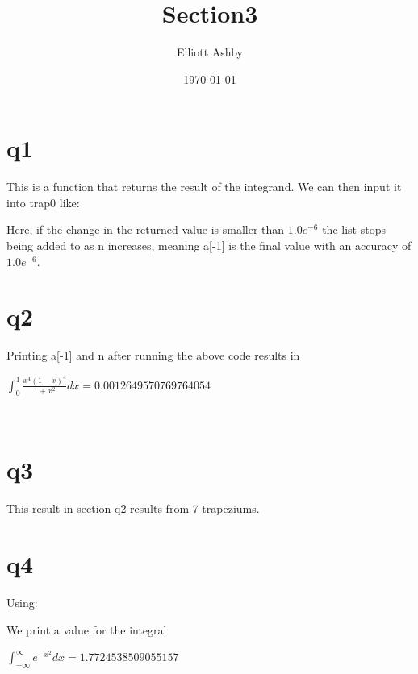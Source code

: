 \documentclass[a4paper,english]{article}
\title{Section3}
\author{Elliott Ashby}
\date{\today}
\begin{document}
    \maketitle
    \section{q1}
     
        This is a function that returns the result of the integrand.
        We can then input it into trap0 like:
    
        Here, if the change in the returned value is smaller than $1.0e^{-6}$ the list stops
        being added to as n increases, meaning a[-1] is the final value with an accuracy
        of $1.0e^{-6}$.
        \\
    \section{q2}
        Printing a[-1] and n after running the above code results in
        \begin{center}
            $\int_0^1{\frac{x^4(1-x)^4}{1+x^2}dx} = 0.0012649570769764054$
        \end{center}
        \\
    \section{q3}
        This result in section q2 results from 7 trapeziums.
        \\
    \section{q4}
        Using:
        
        We print a value for the integral
        \begin{center}
            $\int_{-\infty}^\infty{e^{-x^2}dx} = 1.7724538509055157$
        \end{center}
        \\
\end{document}

